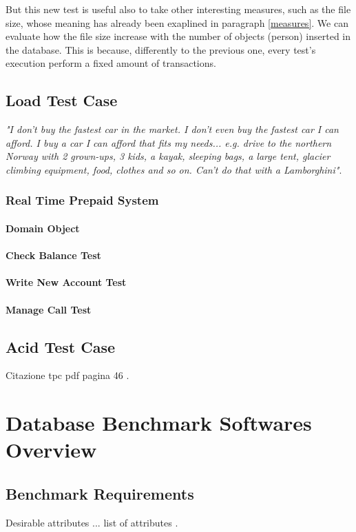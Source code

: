 But this new test is useful also to take other interesting measures, such as the file size, whose meaning has already been exaplined in paragraph \ref{measures}. We can evaluate how the file size increase with the number of objects (person) inserted in the database. This is because, differently to the previous one, every test's execution perform a fixed amount of transactions. 

	\section{Load Test Case}
\emph{"I don't buy the fastest car in the market. I don't even buy the fastest car I can afford. I buy a car I can afford that fits my needs... e.g. drive to the northern Norway with 2 grown-ups, 3 kids, a kayak, sleeping bags, a large tent, glacier climbing equipment, food, clothes and so on. Can't do that with a Lamborghini"}\cite{Bernt}.

		\subsection{Real Time Prepaid System}
			\subsubsection{Domain Object}
			\subsubsection{Check Balance Test}
			\subsubsection{Write New Account Test}
			\subsubsection{Manage Call Test}
	\section{Acid Test Case}
Citazione tpc pdf pagina 46 \cite{TPC-C}.

\chapter{Database Benchmark Softwares Overview}
	\section{Benchmark Requirements}
Desirable attributes ... list of attributes \cite{tpc/sigmoid}.
	
